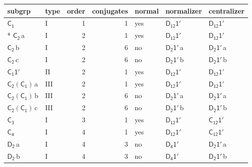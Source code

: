 \documentclass[10pt,a4paper]{article}
\numberwithin{equation}{section}
\newcommand{\grp}[1]{\mathsf{#1}}
\newcommand{\clsletter}[1]{\,{\scriptsize\color{black!55}#1}}
\begin{document}
{\small\begin{longtable}{@{}llrrlll@{}}\toprule
subgrp & type & order & conjugates & normal & normalizer & centralizer\\\midrule\endhead
\bottomrule\endfoot\endlastfoot
\href{../../../rotation/data/pdf/C1.pdf}{$\grp{C_{1}}$} & I & 1 & 1 & yes & \href{D12-1p.pdf}{$\grp{D_{12}1'}$} & \href{D12-1p.pdf}{$\grp{D_{12}1'}$}\\*
\href{../../../rotation/data/pdf/C2.pdf}{$\grp{C_{2}}$}\clsletter{a} & I & 2 & 1 & yes & \href{D12-1p.pdf}{$\grp{D_{12}1'}$} & \href{D12-1p.pdf}{$\grp{D_{12}1'}$}\\
\href{../../../rotation/data/pdf/C2.pdf}{$\grp{C_{2}}$}\clsletter{b} & I & 2 & 6 & no & \href{D2-1p.pdf}{$\grp{D_{2}1'}$}\clsletter{a} & \href{D2-1p.pdf}{$\grp{D_{2}1'}$}\clsletter{a}\\
\href{../../../rotation/data/pdf/C2.pdf}{$\grp{C_{2}}$}\clsletter{c} & I & 2 & 6 & no & \href{D2-1p.pdf}{$\grp{D_{2}1'}$}\clsletter{b} & \href{D2-1p.pdf}{$\grp{D_{2}1'}$}\clsletter{b}\\
\href{C1-1p.pdf}{$\grp{C_{1}1'}$} & II & 2 & 1 & yes & \href{D12-1p.pdf}{$\grp{D_{12}1'}$} & \href{D12-1p.pdf}{$\grp{D_{12}1'}$}\\
\href{C2-C1.pdf}{$\grp{C_{2}}(\grp{C_{1}})$}\clsletter{a} & III & 2 & 1 & yes & \href{D12-1p.pdf}{$\grp{D_{12}1'}$} & \href{D12-1p.pdf}{$\grp{D_{12}1'}$}\\
\href{C2-C1.pdf}{$\grp{C_{2}}(\grp{C_{1}})$}\clsletter{b} & III & 2 & 6 & no & \href{D2-1p.pdf}{$\grp{D_{2}1'}$}\clsletter{a} & \href{D2-1p.pdf}{$\grp{D_{2}1'}$}\clsletter{a}\\
\href{C2-C1.pdf}{$\grp{C_{2}}(\grp{C_{1}})$}\clsletter{c} & III & 2 & 6 & no & \href{D2-1p.pdf}{$\grp{D_{2}1'}$}\clsletter{b} & \href{D2-1p.pdf}{$\grp{D_{2}1'}$}\clsletter{b}\\
\href{../../../rotation/data/pdf/C3.pdf}{$\grp{C_{3}}$} & I & 3 & 1 & yes & \href{D12-1p.pdf}{$\grp{D_{12}1'}$} & \href{C12-1p.pdf}{$\grp{C_{12}1'}$}\\
\href{../../../rotation/data/pdf/C4.pdf}{$\grp{C_{4}}$} & I & 4 & 1 & yes & \href{D12-1p.pdf}{$\grp{D_{12}1'}$} & \href{C12-1p.pdf}{$\grp{C_{12}1'}$}\\
\href{../../../rotation/data/pdf/D2.pdf}{$\grp{D_{2}}$}\clsletter{a} & I & 4 & 3 & no & \href{D4-1p.pdf}{$\grp{D_{4}1'}$} & \href{D2-1p.pdf}{$\grp{D_{2}1'}$}\clsletter{a}\\
\href{../../../rotation/data/pdf/D2.pdf}{$\grp{D_{2}}$}\clsletter{b} & I & 4 & 3 & no & \href{D4-1p.pdf}{$\grp{D_{4}1'}$} & \href{D2-1p.pdf}{$\grp{D_{2}1'}$}\clsletter{b}\\

\end{longtable}}
\end{document}

